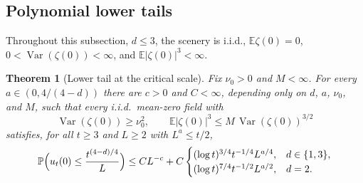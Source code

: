\documentclass[11pt]{amsart}
\theoremstyle{plain}
\newtheorem{theorem}{Theorem}[section]
\theoremstyle{definition}
\newcommand{\E}{\mathbb{E}}
\renewcommand{\P}{\mathbb{P}}
\DeclareMathOperator{\Var}{Var}
\begin{document}
\subsection{Polynomial lower tails}\label{ssec:expl-d123}

	Throughout this subsection, $d\leq3$, the scenery is i.i.d.,
	$\E\zeta(0)=0$, $0<\Var(\zeta(0))<\infty$, and
	$\E|\zeta(0)|^3<\infty$.

\begin{theorem}[Lower tail at the critical scale]\label{thm:critical-toppling}
	Fix $\nu_0>0$ and $M<\infty$. For every $a\in(0,4/(4-d))$ there are $c>0$
	and $C<\infty$, depending only on $d$, $a$, $\nu_0$, and $M$, such that
	every i.i.d.\ mean-zero field with
	\[
		\Var(\zeta(0))\geq\nu_0^2,
		\qquad
		\E|\zeta(0)|^3\leq M\,\Var(\zeta(0))^{3/2}
	\]
	satisfies, for all $t\geq3$ and $L\geq2$ with $L^a\leq t/2$,
	\begin{equation}\label{eq:dlt4-green-lower-tail}
		\P\Bigl(u_t(0)\leq \frac{t^{(4-d)/4}}{L}\Bigr)
		\leq CL^{-c}+C
		\begin{cases}
			(\log t)^{3/4}t^{-1/4}L^{a/4},&d\in\{1,3\},\\
			(\log t)^{7/4}t^{-1/2}L^{a/2},&d=2.
		\end{cases}
	\end{equation}
\end{theorem}
\end{document}
